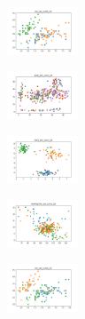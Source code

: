 \begin{figure}[H]    
    \centering
    \begin{subfigure}
        \centering
        \includegraphics[width=0.234\textwidth]{img/hs-ls/iris_set_const_20_949004259_clust.png}
    \end{subfigure}
    \hfill
    \begin{subfigure}
        \centering
        \includegraphics[width=0.234\textwidth]{img/hs-ls/ecoli_set_const_20_949004259_clust.png}
    \end{subfigure}
    \hfill
    \begin{subfigure}
        \centering
        \includegraphics[width=0.234\textwidth]{img/hs-ls/rand_set_const_20_949004259_clust.png}
    \end{subfigure}
    \hfill
    \begin{subfigure}
        \centering
        \includegraphics[width=0.234\textwidth]{img/hs-ls/newthyroid_set_const_20_949004259_clust.png}
    \end{subfigure}
    \hfill
    \begin{subfigure}
        \centering
        \includegraphics[width=0.234\textwidth]{img/hs-ls/iris_set_const_20_589741062_clust.png}
    \end{subfigure}

\end{figure}
